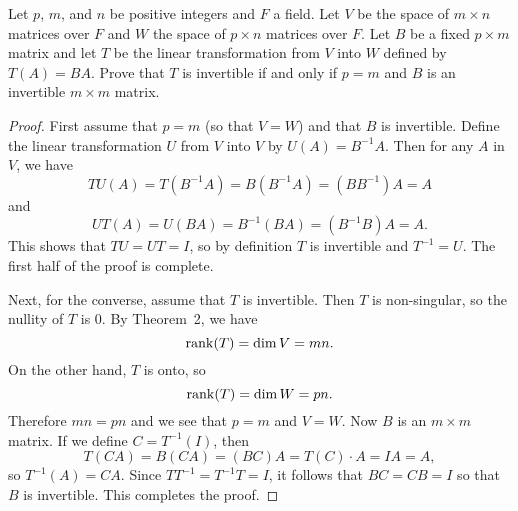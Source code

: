  Let $p$, $m$, and $n$ be positive integers and $F$ a
field. Let $V$ be the space of $m\times n$ matrices over $F$ and $W$
the space of $p\times n$ matrices over $F$. Let $B$ be a fixed
$p\times m$ matrix and let $T$ be the linear transformation from $V$
into $W$ defined by $T(A) = BA$. Prove that $T$ is invertible if and
only if $p = m$ and $B$ is an invertible $m\times m$ matrix.
\begin{proof}
  First assume that $p = m$ (so that $V = W$) and that $B$ is
  invertible. Define the linear transformation $U$ from $V$ into $V$
  by $U(A) = B^{-1}A$. Then for any $A$ in $V$, we have
  \begin{equation*}
    TU(A) = T(B^{-1}A) = B(B^{-1}A) = (BB^{-1})A = A
  \end{equation*}
  and
  \begin{equation*}
    UT(A) = U(BA) = B^{-1}(BA) = (B^{-1}B)A = A.
  \end{equation*}
  This shows that $TU = UT = I$, so by definition $T$ is invertible
  and $T^{-1} = U$. The first half of the proof is complete.

  Next, for the converse, assume that $T$ is invertible. Then $T$ is
  non-singular, so the nullity of $T$ is $0$. By Theorem~2, we have
  \begin{equation*}
    \operatorname{rank}(T) = \dim V = mn.
  \end{equation*}
  On the other hand, $T$ is onto, so
  \begin{equation*}
    \operatorname{rank}(T) = \dim W = pn.
  \end{equation*}
  Therefore $mn = pn$ and we see that $p = m$ and $V = W$. Now $B$ is
  an $m\times m$ matrix. If we define $C = T^{-1}(I)$, then
  \begin{equation*}
    T(CA) = B(CA) = (BC)A = T(C)\cdot A = IA = A,
  \end{equation*}
  so $T^{-1}(A) = CA$. Since $TT^{-1} = T^{-1}T = I$, it follows that
  $BC = CB = I$ so that $B$ is invertible. This completes the proof.
\end{proof}
